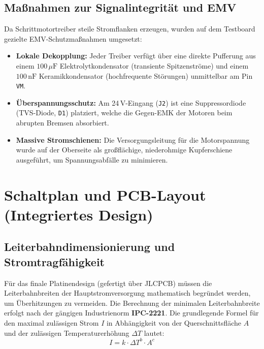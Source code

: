 \subsection{Maßnahmen zur Signalintegrität und EMV}
Da Schrittmotortreiber steile Stromflanken erzeugen, wurden auf dem Testboard gezielte EMV-Schutzmaßnahmen umgesetzt:
\begin{itemize}
	\item \textbf{Lokale Dekopplung:} Jeder Treiber verfügt über eine direkte Pufferung aus einem $100\,\mu\text{F}$ Elektrolytkondensator (transiente Spitzenströme) und einem $100\,\text{nF}$ Keramikkondensator (hochfrequente Störungen) unmittelbar am Pin \texttt{VM}.
	\item \textbf{Überspannungsschutz:} Am 24\,V-Eingang (\texttt{J2}) ist eine Suppressordiode (TVS-Diode, \texttt{D1}) platziert, welche die Gegen-EMK der Motoren beim abrupten Bremsen absorbiert.
	\item \textbf{Massive Stromschienen:} Die Versorgungsleitung für die Motorspannung wurde auf der Oberseite als großflächige, niederohmige Kupferschiene ausgeführt, um Spannungsabfälle zu minimieren.
\end{itemize}

\section{Schaltplan und PCB-Layout (Integriertes Design)}
\label{subsec:pcb_layout}


\subsection{Leiterbahndimensionierung und Stromtragfähigkeit}
\label{subsubsec:trace_calculation}
Für das finale Platinendesign (gefertigt über JLCPCB) müssen die Leiterbahnbreiten der Hauptstromversorgung mathematisch begründet werden, um Überhitzungen zu vermeiden. Die Berechnung der minimalen Leiterbahnbreite erfolgt nach der gängigen Industrienorm \textbf{IPC-2221}.
\cite{a1998_ipc2221}
Die grundlegende Formel für den maximal zulässigen Strom $I$ in Abhängigkeit von der Querschnittsfläche $A$ und der zulässigen Temperaturerhöhung $\Delta T$ lautet:
\begin{equation}
	I = k \cdot \Delta T^{b} \cdot A^{c}
\end{equation}

